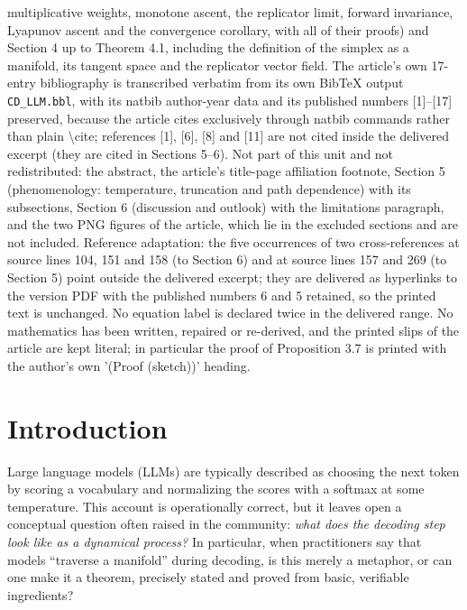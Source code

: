 \documentclass[10pt,a4paper]{amsart}
\numberwithin{equation}{section}
\theoremstyle{plain}
\theoremstyle{definition}
\theoremstyle{remark}
\newcommand{\1}{\mathbbm{1}}
\begin{document}
multiplicative weights, monotone ascent, the replicator limit, forward invariance, Lyapunov ascent and the convergence corollary, with all of their proofs) and Section 4 up to Theorem 4.1, including the definition of the simplex as a manifold, its tangent space and the replicator vector field. The article's own 17-entry bibliography is transcribed verbatim from its own BibTeX output \texttt{CD\_LLM.bbl}, with its natbib author-year data and its published numbers [1]--[17] preserved, because the article cites exclusively through natbib commands rather than plain \textbackslash{}cite; references [1], [6], [8] and [11] are not cited inside the delivered excerpt (they are cited in Sections 5--6). Not part of this unit and not redistributed: the abstract, the article's title-page affiliation footnote, Section 5 (phenomenology: temperature, truncation and path dependence) with its subsections, Section 6 (discussion and outlook) with the limitations paragraph, and the two PNG figures of the article, which lie in the excluded sections and are not included. Reference adaptation: the five occurrences of two cross-references at source lines 104, 151 and 158 (to Section 6) and at source lines 157 and 269 (to Section 5) point outside the delivered excerpt; they are delivered as hyperlinks to the version PDF with the published numbers 6 and 5 retained, so the printed text is unchanged. No equation label is declared twice in the delivered range. No mathematics has been written, repaired or re-derived, and the printed slips of the article are kept literal; in particular the proof of Proposition 3.7 is printed with the author's own '(Proof (sketch))' heading.
\par\smallskip
\section{Introduction}

Large language models (LLMs) are typically described as choosing the next token by
scoring a vocabulary and normalizing the scores with a softmax at some temperature.
This account is operationally correct, but it leaves open a conceptual question often
raised in the community: \emph{what does the decoding step look like as a dynamical process?}
In particular, when practitioners say that models ``traverse a manifold'' during decoding,
is this merely a metaphor, or can one make it a theorem, precisely stated and proved from
basic, verifiable ingredients?
\end{document}
